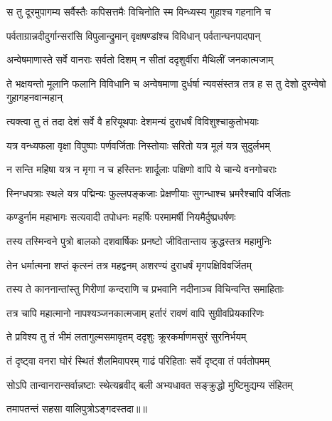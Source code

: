 \twolineshloka
{स तु दूरमुपागम्य सर्वैस्तैः कपिसत्तमैः}
{विचिनोति स्म विन्ध्यस्य गुहाश्च गहनानि च} %

\twolineshloka
{पर्वताग्रान्नदीदुर्गान्सरांसि विपुलान्द्रुमान्}
{वृक्षषण्डांश्च विविधान् पर्वतान्घनपादपान्} %

\twolineshloka
{अन्वेषमाणास्ते सर्वे वानराः सर्वतो दिशम्}
{न सीतां ददृशुर्वीरा मैथिलीं जनकात्मजाम्} %

\threelineshloka
{ते भक्षयन्तो मूलानि फलानि विविधानि च}
{अन्वेषमाणा दुर्धर्षा न्यवसंस्तत्र तत्र ह}
{स तु देशो दुरन्वेषो गुहागहनवान्महान्} %

\twolineshloka
{त्यक्त्वा तु तं तदा देशं सर्वे वै हरियूथपाः}
{देशमन्यं दुराधर्षं विविशुश्चाकुतोभयाः} %

\twolineshloka
{यत्र वन्ध्यफला वृक्षा विपुष्पाः पर्णवर्जिताः}
{निस्तोयाः सरितो यत्र मूलं यत्र सुदुर्लभम्} %

\twolineshloka
{न सन्ति महिषा यत्र न मृगा न च हस्तिनः}
{शार्दूलाः पक्षिणो वापि ये चान्ये वनगोचराः} %

\twolineshloka
{स्निग्धपत्राः स्थले यत्र पद्मिन्यः फुल्लपङ्कजाः}
{प्रेक्षणीयाः सुगन्धाश्च भ्रमरैश्चापि वर्जिताः} %

\twolineshloka
{कण्डुर्नाम महाभागः सत्यवादी तपोधनः}
{महर्षिः परमामर्षी नियमैर्दुष्प्रधर्षणः} %

\twolineshloka
{तस्य तस्मिन्वने पुत्रो बालको दशवार्षिकः}
{प्रनष्टो जीवितान्ताय क्रुद्धस्तत्र महामुनिः} %

\twolineshloka
{तेन धर्मात्मना शप्तं कृत्स्नं तत्र महद्वनम्}
{अशरण्यं दुराधर्षं मृगपक्षिविवर्जितम्} %

\twolineshloka
{तस्य ते काननान्तांस्तु गिरीणां कन्दराणि च}
{प्रभवानि नदीनाञ्च विचिन्वन्ति समाहिताः} %

\twolineshloka
{तत्र चापि महात्मानो नापश्यञ्जनकात्मजाम्}
{हर्तारं रावणं वापि सुग्रीवप्रियकारिणः} %

\twolineshloka
{ते प्रविश्य तु तं भीमं लतागुल्मसमावृतम्}
{ददृशुः क्रूरकर्माणमसुरं सुरनिर्भयम्} %

\twolineshloka
{तं दृष्ट्वा वनरा घोरं स्थितं शैलमिवापरम्}
{गाढं परिहिताः सर्वे दृष्ट्वा तं पर्वतोपमम्} %

\twolineshloka
{सोऽपि तान्वानरान्सर्वान्नष्टाः स्थेत्यब्रवीद् बली}
{अभ्यधावत सङ्क्रुद्धो मुष्टिमुद्यम्य संहितम्} %

{तमापतन्तं सहसा वालिपुत्रोऽङ्गदस्तदा॥॥} %

